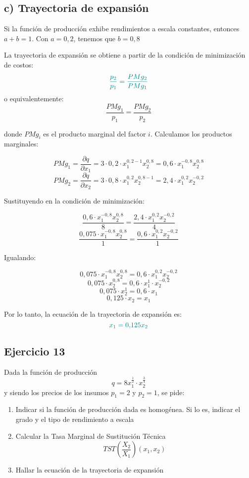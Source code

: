 \documentclass{article}
\begin{document}
\subsection*{c) Trayectoria de expansión}

Si la función de producción exhibe rendimientos a escala constantes, entonces \(a + b = 1\). Con \(a = 0{,}2\), tenemos que \(b = 0{,}8\)

La trayectoria de expansión se obtiene a partir de la condición de minimización de costos:
\[
\color{teal}
\frac{p_2}{p_1} = \frac{PMg_2}{PMg_1}
\]
o equivalentemente:
\[
\frac{PMg_1}{p_1} = \frac{PMg_2}{p_2}
\]

donde \(PMg_i\) es el producto marginal del factor \(i\). Calculamos los productos marginales:

\[
PMg_1 = \frac{\partial q}{\partial x_1} = 3 \cdot 0{,}2 \cdot x_1^{0{,}2-1}x_2^{0{,}8} = 0{,}6 \cdot x_1^{-0{,}8}x_2^{0{,}8}
\]
\[
PMg_2 = \frac{\partial q}{\partial x_2} = 3 \cdot 0{,}8 \cdot x_1^{0{,}2}x_2^{0{,}8-1} = 2{,}4 \cdot x_1^{0{,}2}x_2^{-0{,}2}
\]

Sustituyendo en la condición de minimización:

\[
\frac{0{,}6 \cdot x_1^{-0{,}8}x_2^{0{,}8}}{8} = \frac{2{,}4 \cdot x_1^{0{,}2}x_2^{-0{,}2}}{4}
\]
\[
\frac{0{,}075 \cdot x_1^{-0{,}8}x_2^{0{,}8}}{1} = \frac{0{,}6 \cdot x_1^{0{,}2}x_2^{-0{,}2}}{1}
\]

Igualando:

\[
0{,}075 \cdot x_1^{-0{,}8}x_2^{0{,}8} = 0{,}6 \cdot x_1^{0{,}2}x_2^{-0{,}2}
\]
\[
0{,}075 \cdot x_2^{0{,}8} = 0{,}6 \cdot x_1^{1} \cdot x_2^{-0{,}2}
\]
\[
0{,}075 \cdot x_2^{1} = 0{,}6 \cdot x_1
\]
\[
0{,}125 \cdot x_2 = x_1
\]

Por lo tanto, la ecuación de la trayectoria de expansión es:
\[
\color{teal}
x_1 = 0{,}125x_2
\]


\newpage
\subsection{Ejercicio 13}
Dada la función de producción
\[
q = 8x_1^{\frac{1}{2}} \cdot x_2^{\frac{3}{4}}
\]
y siendo los precios de los insumos \(p_1 = 2\) y \(p_2 = 1\), se pide:

\begin{enumerate}
  \item Indicar si la función de producción dada es homogénea. Si lo es, indicar el grado y el tipo de rendimiento a escala
  \item Calcular la Tasa Marginal de Sustitución Técnica 
  \[
  TST\left(\frac{X_2}{X_1}\right)(x_1, x_2)
  \]
  \item Hallar la ecuación de la trayectoria de expansión
\end{enumerate}
\end{document}
